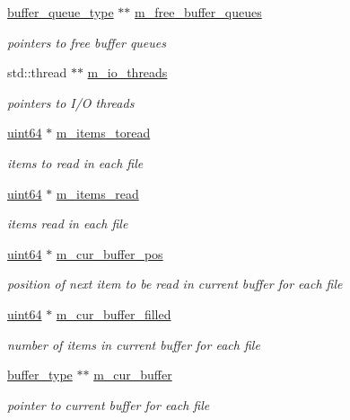 \begin{DoxyCompactItemize}
\hyperlink{classasync__multi__stream__reader_a0bf4b801f7d874da5cbbe5c6504d0ecc}{buffer\+\_\+queue\+\_\+type} $\ast$$\ast$ \hyperlink{classasync__multi__stream__reader_a955fea161fa853f416b372699af70b15}{m\+\_\+free\+\_\+buffer\+\_\+queues}
\begin{DoxyCompactList}\small\item\em pointers to free buffer queues \end{DoxyCompactList}\item 
std\+::thread $\ast$$\ast$ \hyperlink{classasync__multi__stream__reader_ae3ef39404dd6b7fbc2d8339d4e2c5748}{m\+\_\+io\+\_\+threads}
\begin{DoxyCompactList}\small\item\em pointers to I/O threads \end{DoxyCompactList}\item 
\hyperlink{types_8h_a60e8696a4678cd348e991a1f172e53f7}{uint64} $\ast$ \hyperlink{classasync__multi__stream__reader_a47a94d5e9c912c3d448e8039cc650e64}{m\+\_\+items\+\_\+toread}
\begin{DoxyCompactList}\small\item\em items to read in each file \end{DoxyCompactList}\item 
\hyperlink{types_8h_a60e8696a4678cd348e991a1f172e53f7}{uint64} $\ast$ \hyperlink{classasync__multi__stream__reader_acea48aa08da0c9e3065f6c8d00f65ef1}{m\+\_\+items\+\_\+read}
\begin{DoxyCompactList}\small\item\em items read in each file \end{DoxyCompactList}\item 
\hyperlink{types_8h_a60e8696a4678cd348e991a1f172e53f7}{uint64} $\ast$ \hyperlink{classasync__multi__stream__reader_a42a6fa935ef4401a70e1ebfff9437d0d}{m\+\_\+cur\+\_\+buffer\+\_\+pos}
\begin{DoxyCompactList}\small\item\em position of next item to be read in current buffer for each file \end{DoxyCompactList}\item 
\hyperlink{types_8h_a60e8696a4678cd348e991a1f172e53f7}{uint64} $\ast$ \hyperlink{classasync__multi__stream__reader_a7583fa561610fcc9f620d3ad5539e488}{m\+\_\+cur\+\_\+buffer\+\_\+filled}
\begin{DoxyCompactList}\small\item\em number of items in current buffer for each file \end{DoxyCompactList}\item 
\hyperlink{classasync__multi__stream__reader_ad58ad834dc6d741a12be1fb442b8e5d6}{buffer\+\_\+type} $\ast$$\ast$ \hyperlink{classasync__multi__stream__reader_aeedea79263b0e41a5fd3264b26aa39a8}{m\+\_\+cur\+\_\+buffer}
\begin{DoxyCompactList}\small\item\em pointer to current buffer for each file \end{DoxyCompactList}\end{DoxyCompactItemize}



